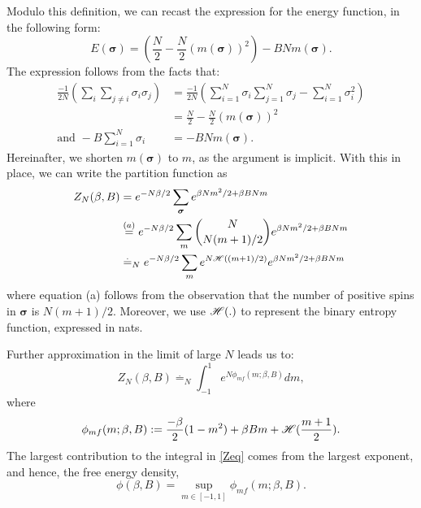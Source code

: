 \documentclass[letterpaper,english,10pt]{article}
\begin{document}
Modulo this definition, we can recast the expression for the energy function, in the following form:
\begin{equation*}
    E(\bm{\sigma}) = \left(\frac{N}{2} - \frac{N}{2}(m(\bm{\sigma}))^{2}\right) - BNm(\bm{\sigma}).
\end{equation*}
The expression follows from the facts that:
\begin{align*}
    \frac{-1}{2N}\left(\sum_{i}\sum_{j\neq i}\sigma_i\sigma_j\right) &= \frac{-1}{2N}\left(\sum_{i=1}^{N}\sigma_{i}\sum_{j=1}^{N}\sigma_j - \sum_{i=1}^{N}\sigma_i^{2}\right)\\
    &= \frac{N}{2} - \frac{N}{2}(m(\bm{\sigma}))^{2}\\
    \text{and }-B\sum_{i=1}^{N}\sigma_i &= -BNm(\bm{\sigma}).
\end{align*}
Hereinafter, we shorten $m(\bm{\sigma})$ to $m$, as the argument is implicit.
With this in place, we can write the partition function as
\begin{align*}
    Z_N(\beta,B) &= e^{-N\beta/2}\sum_{\bm{\sigma}}e^{\beta Nm^{2}/2 + \beta BNm}\\
    &\stackrel{(a)}{=}e^{-N\beta/2}\sum_{m}{N\choose N(m+1)/2} e^{\beta Nm^{2}/2 + \beta BNm}\\
    &\stackrel{.}{=}_{N}e^{-N\beta/2}\sum_{m}e^{N\mathscr{H}((m+1)/2)} e^{\beta Nm^{2}/2 + \beta BNm}
\end{align*}
where equation (a) follows from the observation that the number of positive spins in $\bm{\sigma}$ is $N(m+1)/2$. Moreover, we use $\mathscr{H}(.)$ to represent the binary entropy function, expressed in nats.

Further approximation in the limit of large $N$ leads us to:
\begin{equation}\label{Zeq}
    Z_N(\beta,B)\stackrel{.}{=}_{N} \int_{-1}^{1}e^{N\phi_{mf}(m;\beta,B)}dm,
\end{equation}
where
\begin{equation}\label{phieq}
    \phi_{mf}(m;\beta,B) := \frac{-\beta}{2}(1-m^{2})+\beta Bm + \mathscr{H}(\frac{m+1}{2}).
\end{equation}
The largest contribution to the integral in \eqref{Zeq} comes from the largest exponent, and hence, the free energy density,
\begin{equation*}
    \phi(\beta,B) = \sup_{m\in [-1,1]} \phi_{mf}(m;\beta,B).
\end{equation*}
\end{document}
